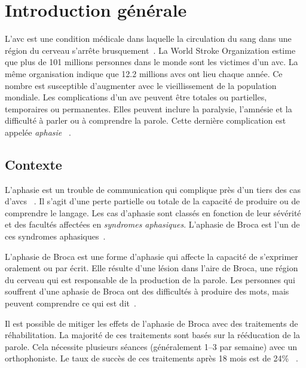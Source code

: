 \chapter*{Introduction générale}
\label{chap.intro}

L'\gls{avc} est une condition médicale dans laquelle 
la circulation du sang dans une région du cerveau s'arrête brusquement~\cite{Larousse}.
La \foreignlanguage{english}{World Stroke Organization} estime que 
plus de 101 millions personnes dans le monde sont les victimes d'un \gls{avc}.
La même organisation indique que 12.2 millions \glspl{avc} ont lieu chaque année.
Ce nombre est susceptible d'augmenter avec le vieillissement de la population mondiale.
Les complications d'un \gls{avc} peuvent être totales ou partielles, temporaires ou permanentes.
Elles peuvent inclure la paralysie, l'amnésie et la difficulté à parler ou à comprendre la parole.
Cette dernière complication est appelée \emph{aphasie}%
~\cite{Feigin_Brainin_Norrving_Martins_Sacco_Hacke_Fisher_Pandian_Lindsay_2022}.


\section*{Contexte}

L'aphasie est un trouble de communication qui complique près d'un tiers des cas d'\glspl{avc}%
~\cite{Flowers_Skoretz_Silver_Rochon_Fang_Flamand-Roze_Martino_2016}.
Il s'agit d'une perte partielle ou totale de la capacité de produire ou de comprendre le langage.
Les cas d'aphasie sont classés en fonction de leur sévérité et des facultés affectées en \emph{syndromes aphasiques}.
L'aphasie de Broca est l'un de ces syndromes aphasiques~\cite{Chapey_2008}.

L'aphasie de Broca est une forme d'aphasie qui affecte la capacité de s'exprimer oralement ou par écrit.
Elle résulte d'une lésion dans l'aire de Broca,
une région du cerveau qui est responsable de la production de la parole.
Les personnes qui souffrent d'une aphasie de Broca ont des difficultés à produire des mots,
mais peuvent comprendre ce qui est dit~\cite{Chapey_2008}.

Il est possible de mitiger les effets de l'aphasie de Broca avec des traitements de réhabilitation.
La majorité de ces traitements sont basés sur la rééducation de la parole.
Cela nécessite plusieurs séances (généralement 1--3 par semaine) avec un orthophoniste.
Le taux de succès de ces traitements après 18 mois est de 24\%%
~\cite{Liu_Huang_Xu_Wu_Tao_Chen_2021,Laska_Hellblom_Murray_Kahan_Von_Arbin_2001,recover}.

